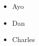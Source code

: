\documentclass{article}
\begin{document}
	\begin{itemize}
		\item Ayo
		\item Dan
		\item Charles
	\end{itemize}
\end{document}
